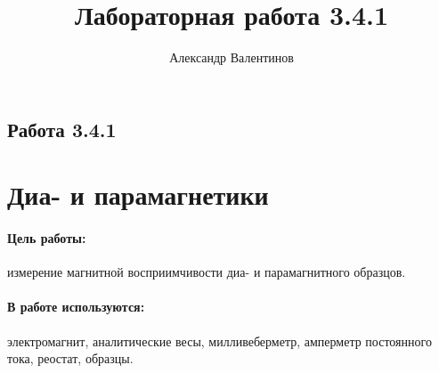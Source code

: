 \documentclass{article}
\author{Александр Валентинов}
\title{Лабораторная работа 3.4.1}
\begin{document}
   \subsection*{Работа 3.4.1}
   \section*{Диа- и парамагнетики}
   \paragraph*{Цель работы:} измерение магнитной восприимчивости диа- и парамагнитного образцов.
   \paragraph*{В работе используются:} электромагнит, аналитические весы, милливеберметр, амперметр постоянного тока, реостат, образцы.
\end{document}
